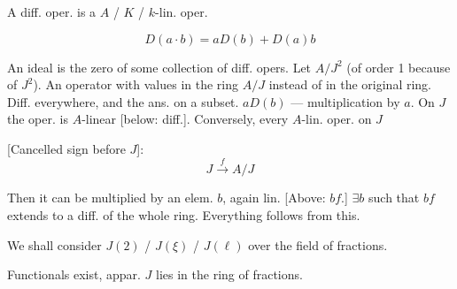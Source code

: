 \par\noindent\begin{minipage}{\linewidth}
A diff. oper. is a $A$ / $K$ / $k$-lin. oper.
\end{minipage}\par
\par\noindent\begin{minipage}{\linewidth}
\begin{equation*}
D(a\cdot b)=aD(b)+D(a)b
\end{equation*}
\end{minipage}\par
An ideal is the zero of some collection of diff. opers.
Let $A/J^2$ (of order 1 because of $J^2$).
An operator with values in the ring $A/J$ instead of in the original ring.
Diff. everywhere, and the ans. on a subset.
$aD(b)$ --- multiplication by $a$.
On $J$ the oper. is $A$-linear [below: diff.].
Conversely, every $A$-lin. oper. on $J$
\par\noindent\begin{minipage}{\linewidth}
[Cancelled sign before $J$]:
\begin{equation*}
J\overset{f}{\longrightarrow}A/J
\end{equation*}
\end{minipage}\par
Then it can be multiplied by an elem. $b$, again lin.
[Above: $bf$.]
$\exists b$ such that $bf$ extends to a diff. of the whole ring.
Everything follows from this.
\par\noindent\begin{minipage}{\linewidth}
We shall consider $J(2)$ / $J(\xi)$ / $J(\ell)$ over the field of fractions.
\end{minipage}\par
Functionals exist, appar. $J$ lies in the ring of fractions.
